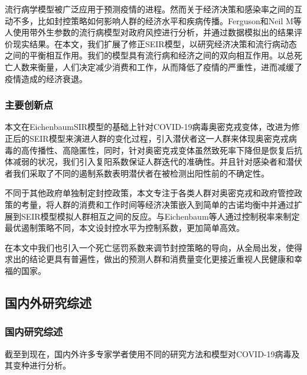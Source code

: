 流行病学模型被广泛应用于预测疫情的进程。然而关于经济决策和感染率之间的互动不多，比如封控策略如何影响人群的经济水平和疾病传播。Ferguson\cite{ferguson2006strategies}和Neil M\cite{ferguson2020report}等人使用带外生参数的流行病模型对政府风控进行分析，并通过数据模拟出的结果评价现实结果。在本文，我们扩展了修正SEIR模型，以研究经济决策和流行病动态之间的平衡相互作用。我们的模型具有流行病和经济之间的双向相互作用。以总死亡人数来衡量，人们决定减少消费和工作，从而降低了疫情的严重性，进而减缓了疫情造成的经济衰退。


\subsubsection{主要创新点}
本文在Eichenbaum\cite{eichenbaum2021macroeconomics}SIR模型的基础上针对COVID-19病毒奥密克戎变体，改进为修正后的SEIR模型来演进人群的变化过程，引入潜伏者这一人群来体现奥密克戎病毒的高传播性、高隐匿性，同时，针对奥密克戎变体虽然致死率下降但是恢复后抗体减弱的状况，我们引入复阳系数保证人群迭代的准确性。并且针对感染者和潜伏者我们采取了不同的遏制系数表明潜伏者在被检测出阳性前的不确定性。

不同于其他政府单独制定封控政策，本文专注于各类人群对奥密克戎和政府管控政策的考量，将人群的消费和工作时间等经济决策嵌入到简单的古诺均衡中并通过扩展到SEIR模型模拟人群相互之间的反应。与Eichenbaum\cite{eichenbaum2021macroeconomics}等人通过控制税率来制定最优遏制策略不同，本文设封控水平为控制系数，更加简单高效。

在本文中我们也引入一个死亡惩罚系数来调节封控策略的导向，从全局出发，使得求出的结论更具有普遍性，做出的预测人群和消费量变化更接近重视人民健康和幸福的国家。
\subsection{国内外研究综述}
\subsubsection{国内研究综述}
截至到现在，国内外许多专家学者使用不同的研究方法和模型对COVID-19病毒及其变种进行分析。

